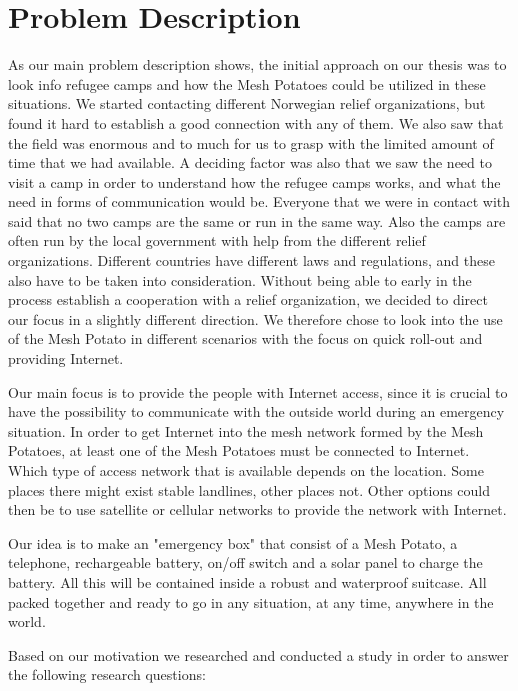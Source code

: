 \section{Problem Description}
As our main problem description shows, the initial approach on our thesis was to look info refugee camps and how the Mesh Potatoes could be utilized in these situations. We started contacting different Norwegian relief organizations, but found it hard to establish a good connection with any of them. We also saw that the field was enormous and to much for us to grasp with the limited amount of time that we had available. A deciding factor was also that we saw the need to visit a camp in order to understand how the refugee camps works, and what the need in forms of communication would be. Everyone that we were in contact with said that no two camps are the same or run in the same way. Also the camps are often run by the local government with help from the different relief organizations. Different countries have different laws and regulations, and these also have to be taken into consideration. Without being able to early in the process establish a cooperation with a relief organization, we decided to direct our focus in a slightly different direction. We therefore chose to look into the use of the Mesh Potato in different scenarios with the focus on quick roll-out and providing Internet.

Our main focus is to provide the people with Internet access, since it is crucial to have the possibility to communicate with the outside world during an emergency situation. In order to get Internet into the mesh network formed by the Mesh Potatoes, at least one of the Mesh Potatoes must be connected to Internet. Which type of access network that is available depends on the location. Some places there might exist stable landlines, other places not. Other options could then be to use satellite or cellular networks to provide the network with Internet.  

Our idea is to make an "emergency box" that consist of a Mesh Potato, a telephone, rechargeable battery, on/off switch and a solar panel to charge the battery. All this will be contained inside a robust and waterproof suitcase. All packed together and ready to go in any situation, at any time, anywhere in the world. 

Based on our motivation we researched and conducted a study in order to answer the following research questions: 

